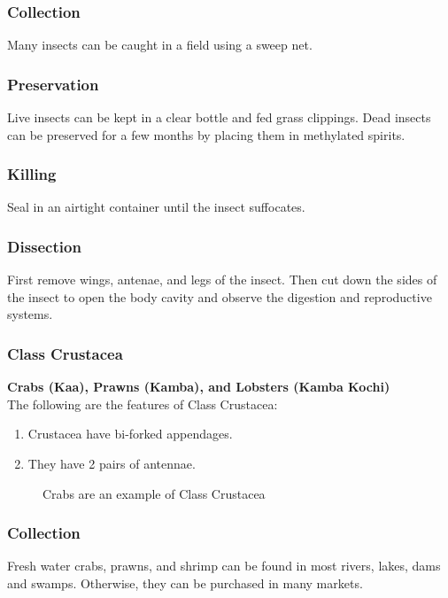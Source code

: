 \subsubsection{Collection}
Many insects can be caught in a field using a sweep net. 

\subsubsection{Preservation} 
Live insects can be kept in a clear bottle and fed grass clippings. Dead insects can be preserved for a few months by placing them in methylated spirits.

\subsubsection{Killing}
Seal in an airtight container until the insect suffocates.

\subsubsection{Dissection}
First remove wings, antenae, and legs of the insect. Then cut down the sides of the insect to open the body cavity and observe the digestion and reproductive systems.
	
\subsubsection{Class Crustacea}
\textbf{Crabs (Kaa), Prawns (Kamba), and Lobsters (Kamba Kochi)}\\
The following are the features of Class Crustacea:
\begin{enumerate}
\item{Crustacea have bi-forked appendages.}
\item{They have 2 pairs of antennae.}
\end{enumerate}

\begin{figure}[h]
\begin{center}
\def\svgwidth{6cm}

\caption{Crabs are an example of Class Crustacea}
\label{fig:crab}
\end{center}
\end{figure}

\subsubsection{Collection}
Fresh water crabs, prawns, and shrimp can be found in most rivers, lakes, dams and swamps. Otherwise, they can be purchased in many markets.


